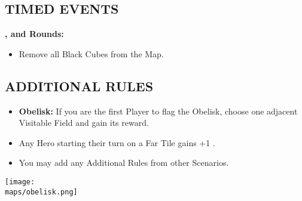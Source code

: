 \begin{multicols*}{2}
\subsection*{\MakeUppercase{Timed Events}}
\textbf{,  and  Rounds:}
\begin{itemize}
  \item Remove all Black Cubes from the Map.
\end{itemize}

\subsection*{\MakeUppercase{Additional Rules}}
\begin{itemize}
  \item \textbf{Obelisk:} If you are the first Player to flag the Obelisk, choose one adjacent Visitable Field and gain its reward.
  \item Any Hero starting their turn on a Far Tile gains +1 .
  \item You may add any Additional Rules from other Scenarios.
\end{itemize}

\begin{center}
  \vfill
  \texttt{[image: \\maps/obelisk.png]}
  \vfill
\end{center}

\end{multicols*}


